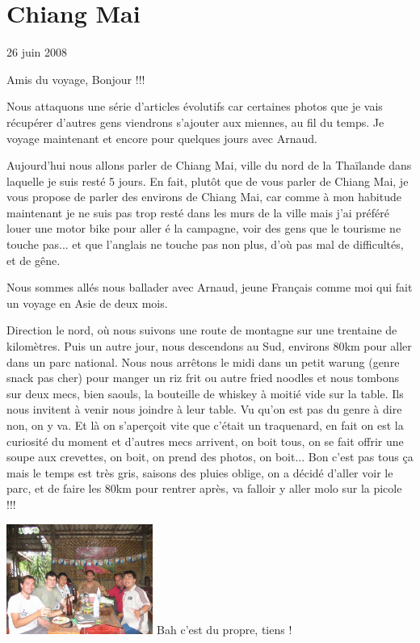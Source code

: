 \section{Chiang Mai}

26 juin 2008

\begin{multicols}{2}

Amis du voyage, Bonjour !!!

Nous attaquons une série d'articles évolutifs car certaines photos que je vais récupérer d'autres gens viendrons s'ajouter aux miennes, au fil du temps. Je voyage maintenant et encore pour quelques jours avec Arnaud.

Aujourd'hui nous allons parler de Chiang Mai, ville du nord de la Thaïlande dans laquelle je suis resté 5 jours. En fait, plutôt que de vous parler de Chiang Mai, je vous propose de parler des environs de Chiang Mai, car comme à mon habitude maintenant je ne suis pas trop resté dans les murs de la ville mais j'ai préféré louer une motor bike pour aller é la campagne, voir des gens que le tourisme ne touche pas... et que l'anglais ne touche pas non plus, d'où pas mal de difficultés, et de gêne.

Nous sommes allés nous ballader avec Arnaud, jeune Français comme moi qui fait un voyage en Asie de deux mois.

Direction le nord, où nous suivons une route de montagne sur une trentaine de kilomètres. Puis un autre jour, nous descendons au Sud, environs 80km pour aller dans un parc national. Nous nous arrêtons le midi dans un petit warung (genre snack pas cher) pour manger un riz frit ou autre fried noodles et nous tombons sur deux mecs, bien saouls, la bouteille de whiskey à moitié vide sur la table. Ils nous invitent à venir nous joindre à leur table. Vu qu'on est pas du genre à dire non, on y va. Et là on s'aperçoit vite que c'était un traquenard, en fait on est la curiosité du moment et d'autres mecs arrivent, on boit tous, on se fait offrir une soupe aux crevettes, on boit, on prend des photos, on boit... Bon c'est pas tous ça mais le temps est très gris, saisons des pluies oblige, on a décidé d'aller voir le parc, et de faire les 80km pour rentrer après, va falloir y aller molo sur la picole !!!

\hspace*{-0.65cm}
\includegraphics[width=4.8cm]{articles/Chiang-mai/1214286196a5oS.jpg}
Bah c'est du propre, tiens !


\end{multicols}

